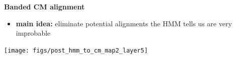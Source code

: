 \documentclass[landscape]{slides}
\begin{document}
\begin{slide}
\begin{center}
\large
\textbf{Banded CM alignment}
\end{center}
\medskip
\small
\begin{itemize}
\item
\textbf{main idea:} eliminate potential alignments the HMM tells us are very improbable
\end{itemize}
\begin{center}
\texttt{[image: figs/post\_hmm\_to\_cm\_map2\_layer5]}
\end{center}
\vfill
\end{slide}
\end{document}
